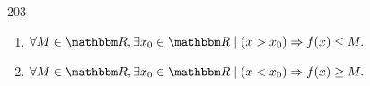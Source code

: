 

\begin{corrige}{203}
\begin{enumerate}
\item $\forall M\in\eR,\exists x_0\in\eR\tq (x>x_0)\Rightarrow f(x)\leq M.$
\item $\forall M\in\eR,\exists x_0\in\eR\tq (x<x_0)\Rightarrow f(x)\geq M.$
\end{enumerate}
\end{corrige}
